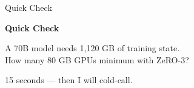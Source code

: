 \documentclass[aspectratio=169, 12pt]{beamer}
\begin{document}
\begin{frame}{Quick Check}

\centering
\vspace{1.0cm}
{\Large\bfseries Quick Check}

\vspace{0.6cm}
{\large A 70B model needs 1,120 GB of training state.\\How many 80 GB GPUs minimum with ZeRO-3?}

\vspace{0.5cm}
{\normalsize\textcolor{midgray}{15 seconds --- then I will cold-call.}}

\end{frame}
\end{document}

